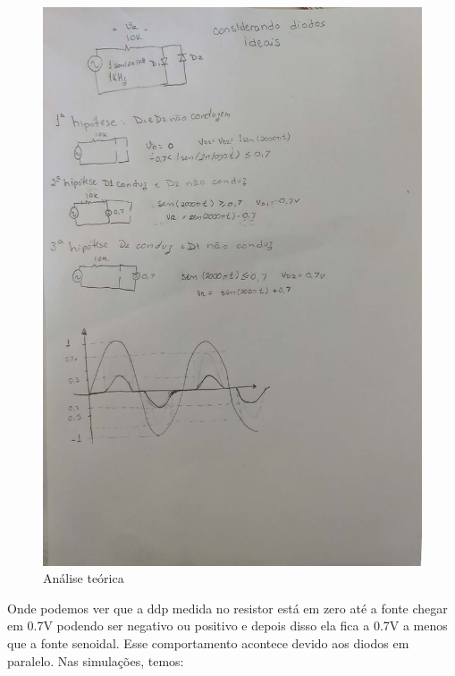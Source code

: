  \begin{figure}[!htb]
    \centering
    \includegraphics[scale = 0.2]{Relatorio1_teo_diodo.png}
    \caption{Análise teórica}
\end{figure}
    
    Onde podemos ver que a ddp medida no resistor está em zero até a fonte chegar em 0.7V podendo ser negativo ou positivo e depois disso ela fica a 0.7V a menos que a fonte senoidal. Esse comportamento acontece devido aos diodos em paralelo. Nas simulações, temos:
    
